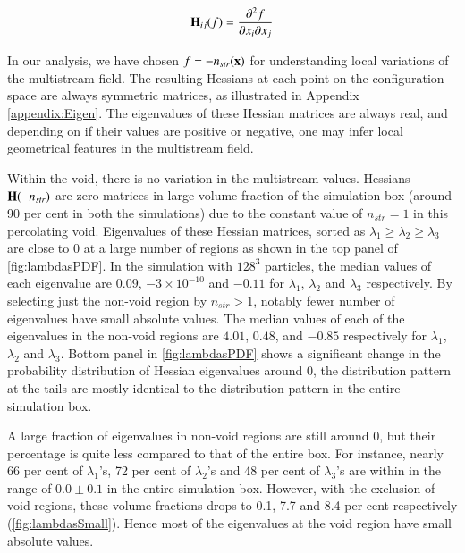 \begin{equation}
\label{eq:Hess}
 {\bf H}_{ij}(f) = \frac{\partial^2 f}{\partial x_i \partial x_j} 
\end{equation}

In our analysis, we have chosen $f = -n_{str}(\bf{x})$ for understanding local variations of the multistream field. The resulting Hessians at each point on the configuration space are always symmetric matrices, as illustrated in Appendix \ref{appendix:Eigen}. The eigenvalues of these Hessian matrices are always real, and depending on if their values are positive or negative, one may infer local geometrical features in the multistream field. 

Within the void, there is no variation in the multistream values. Hessians ${\bf H}(-n_{str})$ are zero matrices in large volume fraction of the simulation box (around 90 per cent in both the simulations) due to the constant value of $n_{str} = 1$ in this percolating void. Eigenvalues of these Hessian matrices, sorted as $ \lambda_1 \geq \lambda_2 \geq \lambda_3 $ are close to 0 at a large number of regions as shown in the top panel of \autoref{fig:lambdasPDF}. In the simulation with $128^3$ particles, the median values of each eigenvalue are $0.09$, $-3\times 10^{-10}$ and $-0.11$ for  $\lambda_1$, $\lambda_2$ and $\lambda_3$ respectively. By selecting just the non-void region by $n_{str} > 1$, notably fewer number of eigenvalues have small absolute values. The median values of each of the eigenvalues in the non-void regions are $4.01$, $0.48$, and $-0.85$ respectively for $\lambda_1$, $\lambda_2$ and  $\lambda_3$. Bottom panel in \autoref{fig:lambdasPDF} shows a significant change in the probability distribution of Hessian eigenvalues around 0, the distribution pattern at the tails are mostly identical to the distribution pattern in the entire simulation box. 


A large fraction of eigenvalues in non-void regions are still around 0, but their percentage is quite less compared to that of the entire box. For instance, nearly 66 per cent of $\lambda_1$'s, 72 per cent of $\lambda_2$'s and 48 per cent of $\lambda_3$'s are  within in the range of $0.0 \pm 0.1$ in the entire simulation box. However, with the exclusion of void regions, these volume fractions drops to 0.1, 7.7 and 8.4 per cent respectively (\autoref{fig:lambdasSmall}). Hence most of the eigenvalues at the void region have small absolute values.

